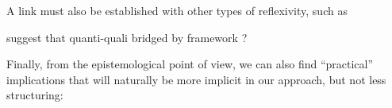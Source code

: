 
A link must also be established with other types of reflexivity, such as \cite{anzoise2017perception}



\cite{shah2006building} suggest that  quanti-quali bridged by framework ?




Finally, from the epistemological point of view, we can also find ``practical'' implications that will naturally be more implicit in our approach, but not less structuring:

